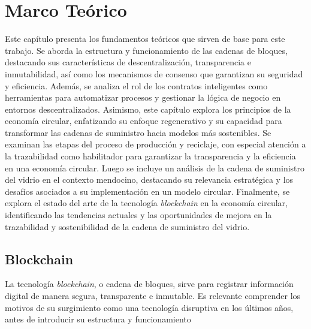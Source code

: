 \chapter[Marco Teórico]{Marco Teórico}
\label{cp:theoretical-framework}

\parindent0pt


Este capítulo presenta los fundamentos teóricos que sirven de base para este trabajo. Se aborda la estructura y funcionamiento de las cadenas de bloques, destacando sus características de descentralización, transparencia e inmutabilidad, así como los mecanismos de consenso que garantizan su seguridad y eficiencia. Además, se analiza el rol de los contratos inteligentes como herramientas para automatizar procesos y gestionar la lógica de negocio en entornos descentralizados. Asimismo, este capítulo explora los principios de la economía circular, enfatizando su enfoque regenerativo y su capacidad para transformar las cadenas de suministro hacia modelos más sostenibles. Se examinan las etapas del proceso de producción y reciclaje, con especial atención a la trazabilidad como habilitador para garantizar la transparencia y la eficiencia en una economía circular. Luego se incluye un análisis de la cadena de suministro del vidrio en el contexto mendocino, destacando su relevancia estratégica y los desafíos asociados a su implementación en un modelo circular. Finalmente, se explora el estado del arte de la tecnología \textit{blockchain} en la economía circular, identificando las tendencias actuales y las oportunidades de mejora en la trazabilidad y sostenibilidad de la cadena de suministro del vidrio.

\section{Blockchain}

La tecnología \textit{blockchain}, o cadena de bloques, sirve para registrar información digital de manera segura, transparente e inmutable. Es relevante comprender los motivos de su surgimiento como una tecnología disruptiva en los últimos años, antes de introducir su estructura y funcionamiento

